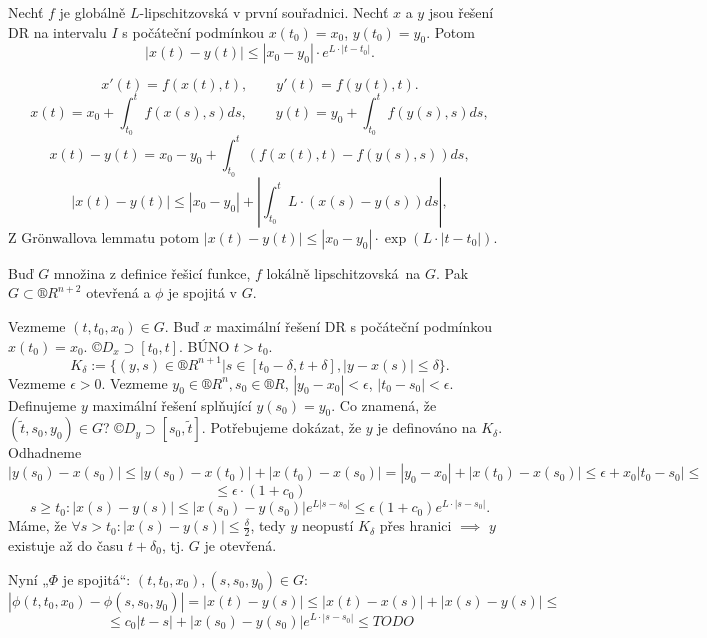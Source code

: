 \documentclass[12pt]{article}					%
\begin{document}
\begin{dusledek}
	Nechť $f$ je globálně $L$-lipschitzovská v první souřadnici. Nechť $x$ a $y$ jsou řešení DR na intervalu $I$ s počáteční podmínkou $x(t_0) = x_0$, $y(t_0) = y_0$. Potom
	$$ |x(t) - y(t)| ≤ |x_0 - y_0|·e^{L·|t - t_0|}. $$

	\begin{dukazin}
		$$ x'(t) = f(x(t), t), \qquad y'(t) = f(y(t), t). $$
		$$ x(t) = x_0 + \int_{t_0}^t f(x(s), s) ds, \qquad y(t) = y_0 + \int_{t_0}^t f(y(s), s) ds, $$
		$$ x(t) - y(t) = x_0 - y_0 + \int_{t_0}^t (f(x(t), t) - f(y(s), s)) ds, $$
		$$ |x(t) - y(t)| ≤ |x_0 - y_0| + \left|\int_{t_0}^t L·(x(s) - y(s)) ds\right|, $$
		Z Grönwallova lemmatu potom $|x(t) - y(t)| ≤ |x_0 - y_0|·\exp(L·|t - t_0|)$.
	\end{dukazin}
\end{dusledek}

\begin{veta}
	Buď $G$ množina z definice řešicí funkce, $f$ lokálně lipschitzovská na $G$. Pak $G \subset ®R^{n+2}$ otevřená a $\phi$ je spojitá v $G$.

	\begin{dukazin}
		Vezmeme $(t, t_0, x_0) \in G$. Buď $x$ maximální řešení DR s počáteční podmínkou $x(t_0) = x_0$. $©D_x \supset [t_0, t]$. BÚNO $t > t_0$.
		$$ K_\delta := \{(y, s) \in ®R^{n+1} | s \in [t_0 - \delta, t + \delta], |y - x(s)| ≤ \delta\}. $$
		Vezmeme $\epsilon > 0$. Vezmeme $y_0 \in ®R^n, s_0 \in ®R$, $|y_0 - x_0| < \epsilon$, $|t_0 - s_0| < \epsilon$. Definujeme $y$ maximální řešení splňující $y(s_0) = y_0$. Co znamená, že $(\tilde{t}, s_0, y_0) \in G$? $©D_y \supset[s_0, \tilde{t}]$. Potřebujeme dokázat, že $y$ je definováno na $K_\delta$. Odhadneme
		$$ |y(s_0) - x(s_0)| ≤ |y(s_0) - x(t_0)| + |x(t_0) - x(s_0)| = |y_0 - x_0| + |x(t_0) - x(s_0)| ≤ \epsilon + x_0 |t_0 - s_0| ≤ $$
		$$ ≤ \epsilon·(1 + c_0) $$
		$$ s ≥ t_0: |x(s) - y(s)| ≤ |x(s_0) - y(s_0)| e^{L|s - s_0|} ≤ \epsilon (1 + c_0) e^{L·|s - s_0|}. $$
		Máme, že $\forall s > t_0: |x(s) - y(s)| ≤ \frac{\delta}{2}$, tedy $y$ neopustí $K_\delta$ přes hranici $\implies$ $y$ existuje až do času $t + \delta_0$, tj. $G$ je otevřená.

		Nyní „$\Phi$ je spojitá“: $(t, t_0, x_0), (s, s_0, y_0) \in G$:
		$$ |\phi(t, t_0, x_0) - \phi(s, s_0, y_0)| = |x(t) - y(s)| ≤ |x(t) - x(s)| + |x(s) - y(s)| ≤ $$
		$$ ≤ c_0|t - s| + |x(s_0) - y(s_0)|e^{L·|s - s_0|} ≤ TODO $$
	\end{dukazin}
\end{veta}
\end{document}
